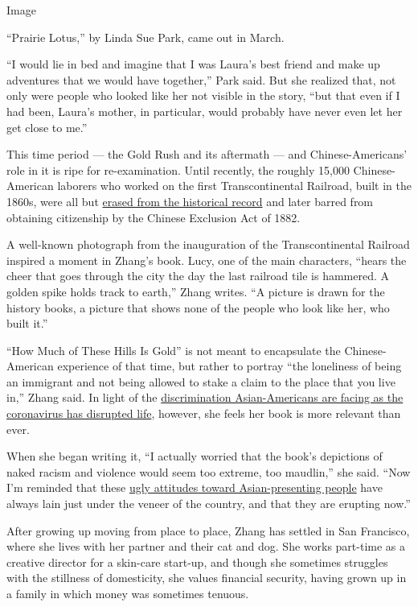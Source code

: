 Image

``Prairie Lotus,'' by Linda Sue Park, came out in March.

``I would lie in bed and imagine that I was Laura's best friend and make
up adventures that we would have together,'' Park said. But she realized
that, not only were people who looked like her not visible in the story,
``but that even if I had been, Laura's mother, in particular, would
probably have never even let her get close to me.''

This time period --- the Gold Rush and its aftermath --- and
Chinese-Americans' role in it is ripe for re-examination. Until
recently, the roughly 15,000 Chinese-American laborers who worked on the
first Transcontinental Railroad, built in the 1860s, were all but
\href{https://www.nytimes3xbfgragh.onion/2019/05/14/us/golden-spike-utah-railroad-150th-anniversary.html}{erased
from the historical record} and later barred from obtaining citizenship
by the Chinese Exclusion Act of 1882.

A well-known photograph from the inauguration of the Transcontinental
Railroad inspired a moment in Zhang's book. Lucy, one of the main
characters, ``hears the cheer that goes through the city the day the
last railroad tile is hammered. A golden spike holds track to earth,''
Zhang writes. ``A picture is drawn for the history books, a picture that
shows none of the people who look like her, who built it.''

``How Much of These Hills Is Gold'' is not meant to encapsulate the
Chinese-American experience of that time, but rather to portray ``the
loneliness of being an immigrant and not being allowed to stake a claim
to the place that you live in,'' Zhang said. In light of the
\href{https://www.nytimes3xbfgragh.onion/2020/03/23/us/chinese-coronavirus-racist-attacks.html}{discrimination
Asian-Americans are facing as the coronavirus has disrupted life},
however, she feels her book is more relevant than ever.

When she began writing it, ``I actually worried that the book's
depictions of naked racism and violence would seem too extreme, too
maudlin,'' she said. ``Now I'm reminded that these
\href{https://www.nytimes3xbfgragh.onion/2020/03/29/us/politics/coronavirus-asian-americans.html}{ugly
attitudes toward Asian-presenting people} have always lain just under
the veneer of the country, and that they are erupting now.''

After growing up moving from place to place, Zhang has settled in San
Francisco, where she lives with her partner and their cat and dog. She
works part-time as a creative director for a skin-care start-up, and
though she sometimes struggles with the stillness of domesticity, she
values financial security, having grown up in a family in which money
was sometimes tenuous.

